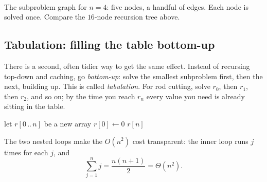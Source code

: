 \begin{center}
\\[1mm]
{\small The subproblem graph for $n=4$: five nodes, a handful of edges. Each
node is solved once. Compare the $16$-node recursion tree above.}
\end{center}

\subsection{Tabulation: filling the table bottom-up}

There is a second, often tidier way to get the same effect. Instead of
recursing top-down and caching, go \emph{bottom-up}: solve the smallest
subproblem first, then the next, building up. This is called \emph{tabulation}.
For rod cutting, solve $r_0$, then $r_1$, then $r_2$, and so on; by the time you
reach $r_n$ every value you need is already sitting in the table.

\begin{algorithm}[H]
\caption{\textsc{Bottom-Up-Cut-Rod}$(p, n)$}
let $r[0\,..\,n]$ be a new array\;
$r[0] \gets 0$\;
\Return $r[n]$\;
\end{algorithm}

The two nested loops make the $O(n^2)$ cost transparent: the inner loop runs
$j$ times for each $j$, and \[
  \sum_{j=1}^n j = \frac{n(n+1)}{2} = \Theta(n^2).
\]

